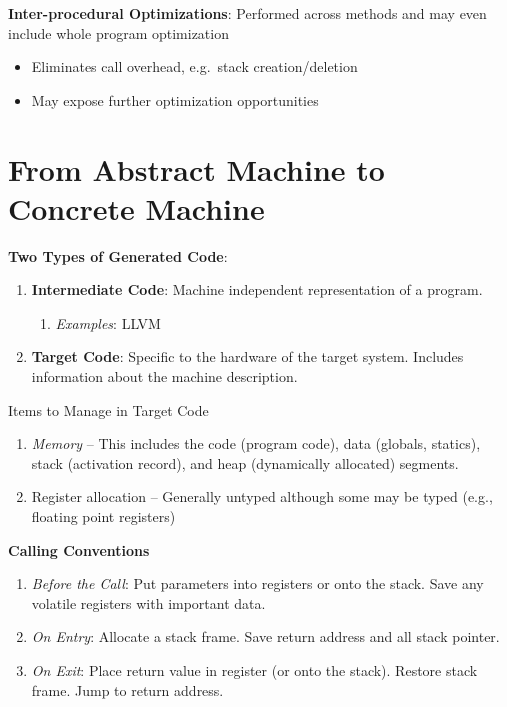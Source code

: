 \documentclass[10pt,twocolumn]{report}
\begin{document}
\textbf{Inter-procedural Optimizations}: Performed across methods and may even include whole program optimization
\begin{itemize}
  \begin{itemize}
    \item Eliminates call overhead, e.g.\ stack creation/deletion
    \item May expose further optimization opportunities
  \end{itemize}
\end{itemize}

\section{From Abstract Machine to Concrete Machine}

\textbf{Two Types of Generated Code}:
\begin{enumerate}
  \item \textbf{Intermediate Code}: Machine independent representation of a program.
    \begin{enumerate}
      \item \emph{Examples}: LLVM
    \end{enumerate}
  \item \textbf{Target Code}: Specific to the hardware of the target system. Includes information about the machine description.
\end{enumerate}

Items to Manage in Target Code
\begin{enumerate}
  \item \emph{Memory} -- This includes the code (program code), data (globals, statics), stack (activation record), and heap (dynamically allocated) segments.
  \item Register allocation -- Generally untyped although some may be typed (e.g., floating point registers)
\end{enumerate}

\textbf{Calling Conventions}
\begin{enumerate}
  \item \emph{Before the Call}: Put parameters into registers or onto the stack. Save any volatile registers with important data.
  \item \emph{On Entry}: Allocate a stack frame. Save return address and all stack pointer.
  \item \emph{On Exit}: Place return value in register (or onto the stack). Restore stack frame. Jump to return address.
\end{enumerate}
\end{document}
